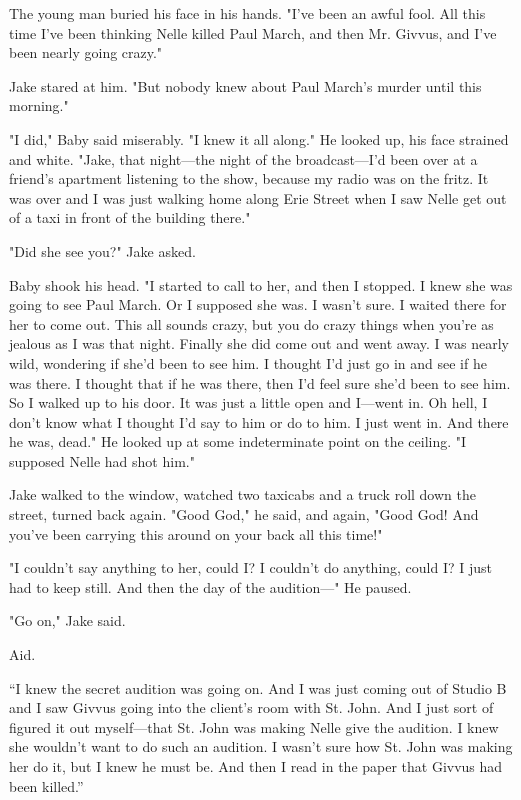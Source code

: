 \documentclass{novel}
\begin{document}
The young man buried his face in his hands. "I've been an awful fool. All this time I've been thinking Nelle killed Paul March, and then Mr. Givvus, and I've been nearly going crazy."

Jake stared at him. "But nobody knew about Paul March's murder until this morning."

"I did," Baby said miserably. "I knew it all along." He looked up, his face strained and white. "Jake, that night—the night of the broadcast—I'd been over at a friend's apartment listening to the show, because my radio was on the fritz. It was over and I was just walking home along Erie Street when I saw Nelle get out of a taxi in front of the building there."

"Did she see you?" Jake asked.

Baby shook his head. "I started to call to her, and then I stopped. I knew she was going to see Paul March. Or I supposed she was. I wasn't sure. I waited there for her to come out. This all sounds crazy, but you do crazy things when you're as jealous as I was that night. Finally she did come out and went away. I was nearly wild, wondering if she'd been to see him. I thought I'd just go in and see if he was there. I thought that if he was there, then I'd feel sure she'd been to see him. So I walked up to his door. It was just a little open and I—went in. Oh hell, I don't know what I thought I'd say to him or do to him. I just went in. And there he was, dead." He looked up at some indeterminate point on the ceiling. "I supposed Nelle had shot him."

Jake walked to the window, watched two taxicabs and a truck roll down the street, turned back again. "Good God," he said, and again, "Good God! And you've been carrying this around on your back all this time!"

"I couldn't say anything to her, could I? I couldn't do anything, could I? I just had to keep still. And then the day of the audition—" He paused.

"Go on," Jake said.

Aid.

“I knew the secret audition was going on. And I was just coming out of Studio B and I saw Givvus going into the client’s room with St. John. And I just sort of figured it out myself—that St. John was making Nelle give the audition. I knew she wouldn’t want to do such an audition. I wasn’t sure how St. John was making her do it, but I knew he must be. And then I read in the paper that Givvus had been killed.”
\end{document}
